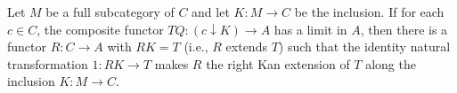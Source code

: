 Let $M$ be a full subcategory of $C$ and let $K: M \to C$ be the inclusion. If for each $c \in C$, the composite functor $TQ: (c \downarrow K) \to A$ has a limit in $A$, then there is a functor $R: C \to A$ with $RK = T$ (i.e., $R$ extends $T$) such that the identity natural transformation $1: RK \to T$ makes $R$ the right Kan extension of $T$ along the inclusion $K: M \to C$.

